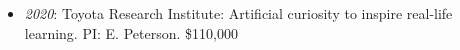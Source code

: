 \begin{itemize}
\tightlist
\item
  \emph{2020}: Toyota Research Institute: Artificial curiosity to
  inspire real-life learning. PI: E. Peterson. \$110,000
\end{itemize}
